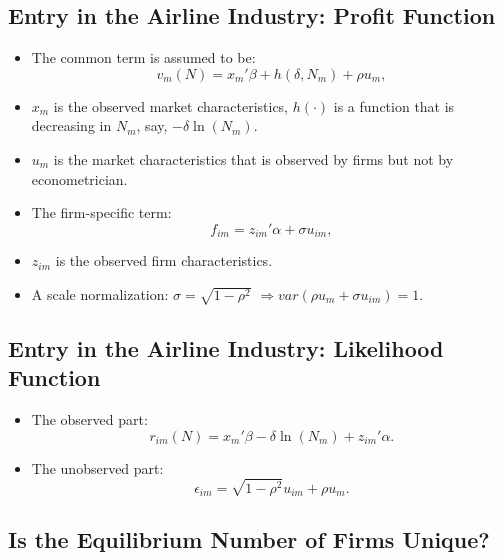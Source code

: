 \documentclass[
]{book}
\providecommand{\tightlist}{%
  \setlength{\itemsep}{0pt}\setlength{\parskip}{0pt}}
\begin{document}
\hypertarget{entry-in-the-airline-industry-profit-function-1}{%
\subsection{Entry in the Airline Industry: Profit Function}\label{entry-in-the-airline-industry-profit-function-1}}

\begin{itemize}
\tightlist
\item
  The common term is assumed to be:
  \[
  v_m(N) = x_m' \beta + h(\delta, N_m) + \rho u_{m}, 
  \]
\item
  \(x_m\) is the observed market characteristics, \(h(\cdot)\) is a function that is decreasing in \(N_m\), say, \(- \delta \ln (N_m)\).
\item
  \(u_m\) is the market characteristics that is observed by firms but not by econometrician.
\item
  The firm-specific term:
  \[
  f_{im} = z_{im}' \alpha + \sigma u_{im},
  \]
\item
  \(z_{im}\) is the observed firm characteristics.
\item
  A scale normalization: \(\sigma = \sqrt{1 - \rho^2}\) \(\Rightarrow var(\rho u_m + \sigma u_{im}) = 1\).
\end{itemize}

\hypertarget{entry-in-the-airline-industry-likelihood-function}{%
\subsection{Entry in the Airline Industry: Likelihood Function}\label{entry-in-the-airline-industry-likelihood-function}}

\begin{itemize}
\tightlist
\item
  The observed part:
  \[
  r_{im}(N) = x_m' \beta - \delta \ln (N_m) + z_{im}' \alpha. 
  \]
\item
  The unobserved part:
  \[
  \epsilon_{im} = \sqrt{1 - \rho^2} u_{im} + \rho u_{m}.
  \]
\end{itemize}

\hypertarget{is-the-equilibrium-number-of-firms-unique}{%
\subsection{Is the Equilibrium Number of Firms Unique?}\label{is-the-equilibrium-number-of-firms-unique}}
\end{document}
